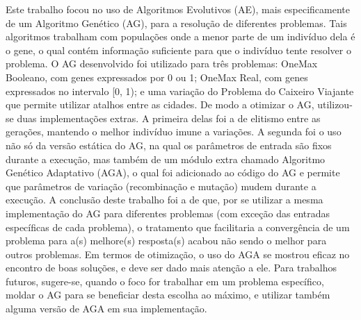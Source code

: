 Este trabalho focou no uso de Algoritmos Evolutivos (AE), mais especificamente de um Algoritmo Genético (AG), para a resolução de diferentes problemas. Tais algoritmos trabalham com populações onde a menor parte de um indivíduo dela é o gene, o qual contém informação suficiente para que o indivíduo tente resolver o problema. O AG desenvolvido foi utilizado para três problemas: OneMax Booleano, com genes expressados por 0 ou 1; OneMax Real, com genes expressados no intervalo [0, 1); e uma variação do Problema do Caixeiro Viajante que permite utilizar atalhos entre as cidades. De modo a otimizar o AG, utilizou-se duas implementações extras. A primeira delas foi a de elitismo entre as gerações, mantendo o melhor indivíduo imune a variações. A segunda foi o uso não só da versão estática do AG, na qual os parâmetros de entrada são fixos durante a execução, mas também de um módulo extra chamado Algoritmo Genético Adaptativo (AGA), o qual foi adicionado ao código do AG e permite que parâmetros de variação (recombinação e mutação) mudem durante a execução. A conclusão deste trabalho foi a de que, por se utilizar a mesma implementação do AG para diferentes problemas (com exceção das entradas específicas de cada problema), o tratamento que facilitaria a convergência de um problema para a(s) melhore(s) resposta(s) acabou não sendo o melhor para outros problemas. Em termos de otimização, o uso do AGA se mostrou eficaz no encontro de boas soluções, e deve ser dado mais atenção a ele. Para trabalhos futuros, sugere-se, quando o foco for trabalhar em um problema específico, moldar o AG para se beneficiar desta escolha ao máximo, e utilizar também alguma versão de AGA em sua implementação.
